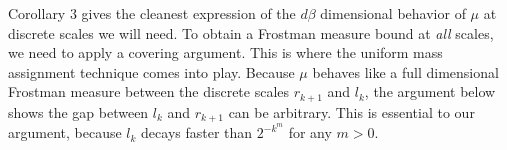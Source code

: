 \documentclass[dvipsnames]{article}
\theoremstyle{plain}
\newtheorem{corollary}{Corollary}
\theoremstyle{plain}
\begin{document}



Corollary 3 gives the cleanest expression of the $d \beta$ dimensional behavior of $\mu$ at discrete scales we will need. To obtain a Frostman measure bound at {\it all} scales, we need to apply a covering argument. This is where the uniform mass assignment technique comes into play. Because $\mu$ behaves like a full dimensional Frostman measure between the discrete scales $r_{k+1}$ and $l_k$, the argument below shows the gap between $l_k$ and $r_{k+1}$ can be arbitrary. This is essential to our argument, because $l_k$ decays faster than $2^{-k^m}$ for any $m > 0$.
\end{document}
